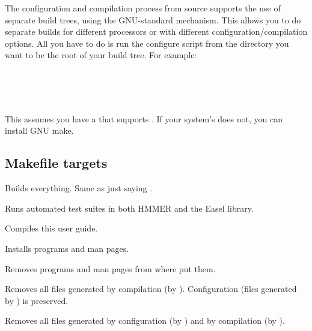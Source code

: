 The configuration and compilation process from source supports the use
of separate build trees, using the GNU-standard 
mechanism. This allows you to do separate builds for different
processors or with different configuration/compilation options. All
you have to do is run the configure script from the directory you want
to be the root of your build tree.  For example:

  \vspace{1ex}
  \\
  \\
  \\
  \vspace{1ex}

This assumes you have a  that supports . If your
system's  does not, you can install GNU make.


\subsection{Makefile targets}

\begin{sreitems}{}

\item[\monob{all}]
  Builds everything. Same as just saying .

\item[\monob{check}]
  Runs automated test suites in both HMMER and the Easel library.

\item[\monob{pdf}]
  Compiles this user guide.

\item[\monob{install}]
  Installs programs and man pages.

\item[\monob{uninstall}]
  Removes programs and man pages from where  put them.

\item[\monob{clean}] Removes all files generated by compilation (by
  ). Configuration (files generated by )
  is preserved.

\item[\monob{distclean}]
  Removes all files generated by configuration (by )
  and by compilation (by ). 

\end{sreitems}


